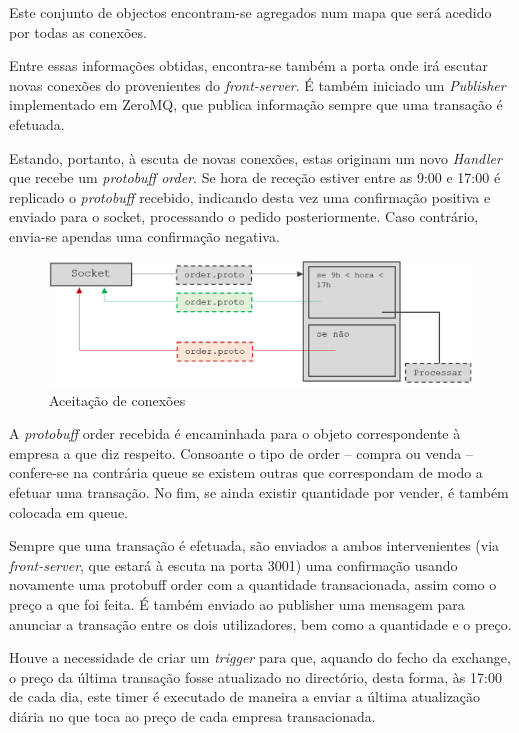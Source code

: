 \documentclass[a4paper,12pt]{article}
\begin{document}
\par Este conjunto de objectos encontram-se agregados num mapa que será acedido por todas as conexões. 

\par Entre essas informações obtidas, encontra-se também a porta onde irá escutar novas conexões do provenientes do \textit{front-server}. É também iniciado um \textit{Publisher} implementado em ZeroMQ, que publica informação sempre que uma transação é efetuada.

\par Estando, portanto, à escuta de novas conexões, estas originam um novo \textit{Handler} que recebe um \textit{protobuff order}. Se hora de receção estiver entre as 9:00 e 17:00 é replicado o \textit{protobuff} recebido, indicando desta vez uma confirmação positiva e enviado para o socket, processando o pedido posteriormente. Caso contrário, envia-se apendas uma confirmação negativa.

\begin{figure}[h]
  \centering
      \includegraphics[width=1\textwidth]{d1.png}
  \caption{Aceitação de conexões}
\end{figure}

\par A \textit{protobuff} order recebida é encaminhada para o objeto correspondente à empresa a que diz respeito. Consoante o tipo de order – compra ou venda – confere-se na contrária queue se existem outras que correspondam de modo a efetuar uma transação. No fim, se ainda existir quantidade por vender, é também colocada em queue.
\par Sempre que uma transação é efetuada, são enviados a ambos intervenientes (via \textit{front-server}, que estará à escuta na porta 3001) uma confirmação usando novamente uma protobuff order com a quantidade transacionada, assim como o preço a que foi feita.  É também enviado ao publisher uma mensagem para anunciar a transação entre os dois utilizadores, bem como a quantidade e o preço.  
\par Houve a necessidade de criar um \textit{trigger} para que, aquando do fecho da exchange, o preço da última transação fosse atualizado no directório, desta forma, às 17:00 de cada dia, este timer é executado de maneira a enviar a última atualização diária no que toca ao preço de cada empresa transacionada.
\end{document}
